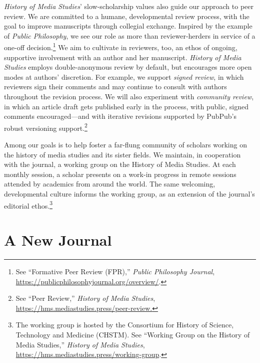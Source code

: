 \documentclass{tufte-handout}
\begin{document}
\emph{History of Media Studies}' slow-scholarship values also guide our
approach to peer review. We are committed to a humane, developmental
review process, with the goal to improve manuscripts through collegial
exchange. Inspired by the example of \emph{Public Philosophy}, we see
our role as more than reviewer-herders in service of a one-off
decision.\footnote{See ``Formative Peer Review (FPR),'' \emph{Public Philosophy Journal},
  \url{https://publicphilosophyjournal.org/overview/}.
} We aim to cultivate in
reviewers, too, an ethos of ongoing, supportive involvement with an
author and her manuscript. \emph{History of Media Studies} employs
double-anonymous review by default, but encourages more open modes at
authors' discretion. For example, we support \emph{signed review}, in
which reviewers sign their comments and may continue to consult with
authors throughout the revision process. We will also experiment with
\emph{community review}, in which an article draft gets published early
in the process, with public, signed comments encouraged---and with
iterative revisions supported by PubPub's robust versioning
support.\footnote{See ``Peer Review,'' \emph{History of Media Studies},
  \url{https://hms.mediastudies.press/peer-review.}
}

Among our goals is to help foster a far-flung community of scholars
working on the history of media studies and its sister fields. We
maintain, in cooperation with the journal, a working group on the
History of Media Studies. At each monthly session, a scholar presents on
a work-in progress in remote sessions attended by academics from around
the world. The same welcoming, developmental culture informs the working
group, as an extension of the journal's editorial
ethos.\footnote{ The working group is hosted by the Consortium for History of Science,
  Technology and Medicine (CHSTM). See ``Working Group on the History of
  Media Studies,'' \emph{History of Media Studies},
  \url{https://hms.mediastudies.press/working-group}.}

\hypertarget{a-new-journal}{%
\section{A New Journal}\label{a-new-journal}}
\end{document}
